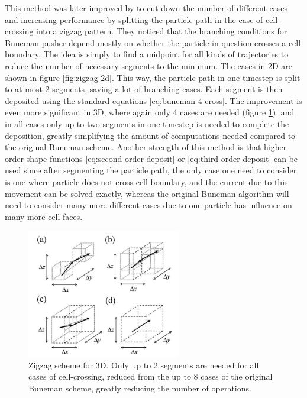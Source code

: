 This method was later improved by \citet{umeda_new_2003} to cut down the number
of different cases and increasing performance by splitting the particle path in
the case of cell-crossing into a zigzag pattern. They noticed that the branching
conditions for Buneman pusher depend mostly on whether the particle in question
crosses a cell boundary. The idea is simply to find a midpoint for all kinds of
trajectories to reduce the number of necessary segments to the minimum. The
cases in 2D are shown in figure \ref{fig:zigzag-2d}. This way, the particle path
in one timestep is split to at most 2 segments, saving a lot of branching cases.
Each segment is then deposited using the standard equations
\eqref{eq:buneman-4-cross}. The improvement is even more significant in 3D,
where again only 4 cases are needed (figure \ref{fig:zigzag-3d}), and in all
cases only up to two segments in one timestep is needed to complete the
deposition, greatly simplifying the amount of computations needed compared to
the original Buneman scheme. Another strength of this method is that higher
order shape functions \eqref{eq:second-order-deposit} or
\eqref{eq:third-order-deposit} can be used since after segmenting the particle
path, the only case one need to consider is one where particle does not cross
cell boundary, and the current due to this movement can be solved exactly,
whereas the original Buneman algorithm will need to consider many more different
cases due to one particle has influence on many more cell faces.

\begin{figure}[h]
  \centering
  \includegraphics[width=0.6\textwidth]{pics/chap1/umeda-3d.png}
  \caption[Zigzag scheme in 3D.]{Zigzag scheme for 3D. Only up to 2 segments are
    needed for all cases of cell-crossing, reduced from the up to 8 cases of the
    original Buneman scheme, greatly reducing the number of operations. \cite{umeda_new_2003}}
  \label{fig:zigzag-3d}
\end{figure}


